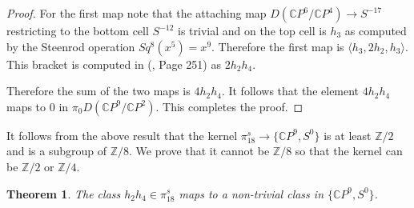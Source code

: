 \documentclass[a4paper,leqno,12pt]{amsart}
\theoremstyle{plain}
\newtheorem{theorem}{Theorem}[section]
\theoremstyle{definition}
\numberwithin{equation}{section}
\begin{document}
\begin{proof}
For the first map note that the attaching map $D({\mathbb{C}} P^6/{\mathbb{C}} P^4) \to S^{-17}$ restricting to the bottom cell $S^{-12}$ is trivial and on the top cell is $h_3$ as computed by the Steenrod operation $Sq^8(x^5)=x^9$. Therefore the first map is $\langle h_3, 2h_2,h_3\rangle$. This bracket is computed in (\cite{Koch96}, Page 251) as $2h_2h_4$. 

Therefore the sum of the two maps is $4h_2h_4$. It follows that the element $4h_2h_4$ maps to $0$ in $\pi_0 D({\mathbb{C}} P^9/ {\mathbb{C}} P^2)$. This completes the proof.  
\end{proof}

It follows from the above result that the kernel $\pi_{18}^s \to \{{\mathbb{C}} P^9, S^0\}$ is at least ${\mathbb{Z}}/2$ and is a subgroup of ${\mathbb{Z}}/8$. We prove that it cannot be ${\mathbb{Z}}/8$ so that the kernel can be ${\mathbb{Z}}/2$ or ${\mathbb{Z}}/4$. 

\begin{theorem}\label{nontriv18}
The class $h_2h_4\in \pi_{18}^s$ maps to a non-trivial class in $\{{\mathbb{C}} P^9, S^0\}$.
\end{theorem}
\end{document}
